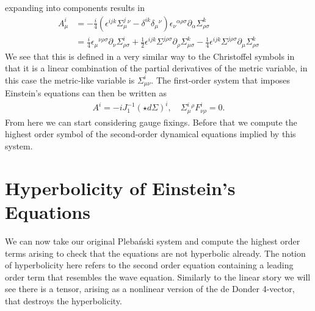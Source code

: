 \documentclass[10pt]{report}
\newcommand{\pleb}[0]{Pleba\'nski}
\theoremstyle{definition}
\begin{document}
        expanding into components results in
        \begin{align}
            A^i_\mu &=  -\frac{i}{4}( \epsilon^{ijk} \Sigma^j_\mu{}^\nu - \delta^{ik} \delta_\mu{}^\nu ) \epsilon_\nu{}^{\alpha\rho\sigma} \partial_\alpha \Sigma^k_{\rho\sigma} \\
            &= \frac{i}{4} \epsilon_\mu{}^{\nu\rho\sigma} \partial_\nu \Sigma^i_{\rho\sigma} + \frac{1}{2} \epsilon^{ijk} \Sigma^{j\rho\sigma} \partial_\rho \Sigma^k_{\mu\sigma} - \frac{1}{4} \epsilon^{ijk} \Sigma^{j\rho\sigma} \partial_\mu \Sigma^k_{\rho\sigma} \label{eq:nonlinear-self-dual-connection-from-Sigma}
        \end{align}
        We see that this is defined in a very similar way to the Christoffel symbols in that it is a linear combination of the partial derivatives of the metric variable, in this case the metric-like variable is $\Sigma^i_{\mu\nu}$. The first-order system that imposes Einstein's equations can then be written as
        \begin{align}
            A^i = -i J_1^{-1}(\star d \Sigma)^i, \quad \Sigma^i_\mu{}^\rho F^i_{\nu\rho} = 0. \label{eq:nonlinear-original-plebanski-system}
        \end{align}
        From here we can start considering gauge fixings. Before that we compute the highest order symbol of the second-order dynamical equations implied by this system.

        \section{Hyperbolicity of Einstein's Equations} \label{sec:nonlin-hyperbolicity-check}
        We can now take our original \pleb{} system and compute the highest order terms arising to check that the equations are not hyperbolic already. The notion of hyperbolicity here refers to the second order equation containing a leading order term that resembles the wave equation. Similarly to the linear story we will see there is a tensor, arising as a nonlinear version of the de Donder 4-vector, that destroys the hyperbolicity.
\end{document}
